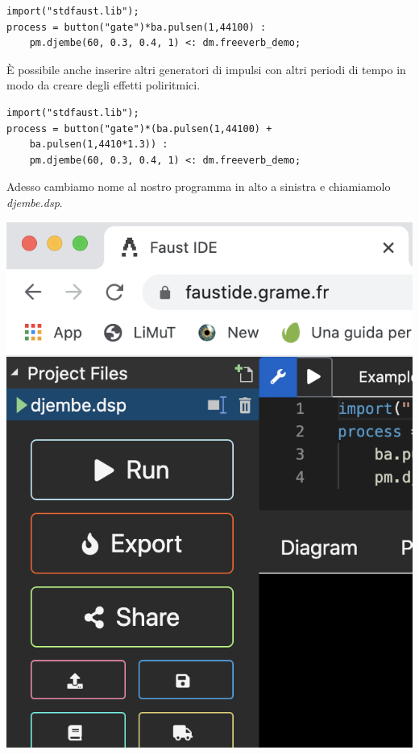 \documentclass[11pt]{article}
\begin{document}
\begin{multicols*}{2}
\begin{Verbatim}[fontsize=\footnotesize]
import("stdfaust.lib");
process = button("gate")*ba.pulsen(1,44100) : 
    pm.djembe(60, 0.3, 0.4, 1) <: dm.freeverb_demo;
\end{Verbatim}

È possibile anche inserire altri generatori di impulsi con altri periodi di tempo in modo da creare degli effetti poliritmici.

\begin{Verbatim}[fontsize=\footnotesize]
import("stdfaust.lib");
process = button("gate")*(ba.pulsen(1,44100) + 
    ba.pulsen(1,4410*1.3)) : 
    pm.djembe(60, 0.3, 0.4, 1) <: dm.freeverb_demo;
\end{Verbatim}

Adesso cambiamo nome al nostro programma in alto a sinistra e chiamiamolo \textit{djembe.dsp}.

\begin{center}
\includegraphics[scale=0.4]{img/03.png}


\end{center}
\end{multicols*}
\end{document}
